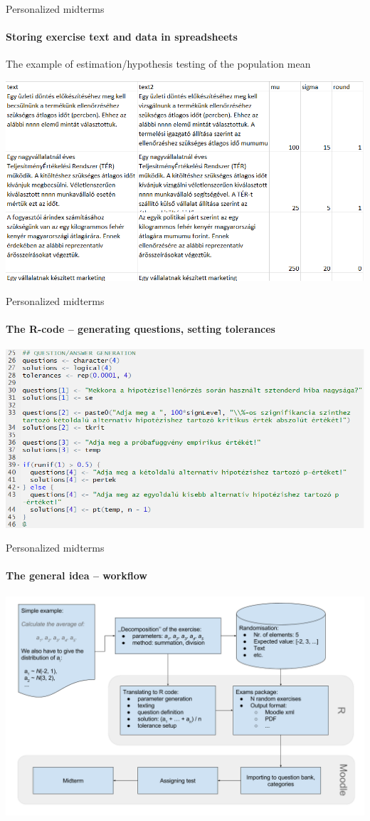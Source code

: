 \documentclass[10pt]{beamer}
\begin{document}
\begin{frame}{Personalized midterms}
\framesubtitle{Storing exercise text and data in spreadsheets}
The example of estimation/hypothesis testing of the population mean
\begin{center}
\includegraphics[width = \textwidth]{graph/excel.png}
\end{center}
\end{frame}

\begin{frame}{Personalized midterms}
\framesubtitle{The R-code -- generating questions, setting tolerances}
\begin{center}
\includegraphics[width = \textwidth]{graph/R2.png}
\end{center}
\end{frame}

\begin{frame}{Personalized midterms}
\framesubtitle{The general idea -- workflow}
\begin{center}
\includegraphics[width = \textwidth]{graph/zh_workflow_eng.png}
\end{center}
\end{frame}
\end{document}
